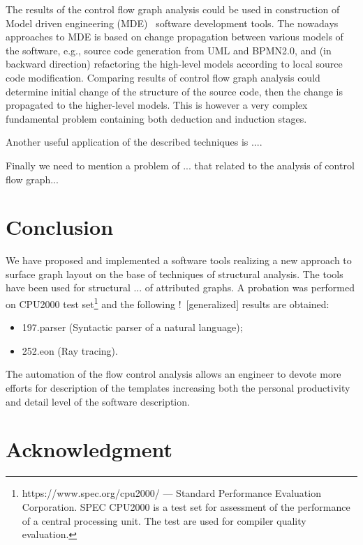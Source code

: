 \documentclass[conference]{IEEEtran}
\newcommand{\nnn}[2][ncolor]{\noindent%
\textcolor{eclr}{!\ [}\textcolor{#1}{#2}\textcolor{eclr}{]}}
\begin{document}
The results of the control flow graph analysis could be used in construction of Model driven engineering (MDE)~\cite{book,eugeneai} software development tools.  The nowadays approaches to MDE is based on change propagation between various models of the software, e.g., source code generation from UML and BPMN2.0, and (in backward direction) refactoring the high-level models according to local source code modification.  Comparing results of control flow graph analysis could determine initial change of the structure of the source code, then the change is propagated to the higher-level models.  This is however a very complex fundamental problem containing both deduction and induction stages.

Another useful application of the described techniques is ....

Finally we need to mention a problem of ... that related to the analysis of control flow graph...


\section{Conclusion}
We have proposed and implemented a software tools realizing a new approach to surface graph layout on the base of techniques of structural analysis.  The tools have been used for structural ... of attributed graphs.  A probation was performed on CPU2000 test set\footnote{https://www.spec.org/cpu2000/ --- Standard Performance Evaluation Corporation.  SPEC CPU2000 is a test set for assessment of the performance of a central processing unit. The test are used for compiler quality evaluation.} and the following \nnn{generalized} results are obtained:
\begin{itemize}
\item 197.parser (Syntactic parser of a natural language);
\item 252.eon (Ray tracing).
\end{itemize}




The automation of the flow control analysis allows an engineer to devote more efforts for description of the templates increasing both the personal productivity and detail level of the software description.




\section*{Acknowledgment}
\end{document}
